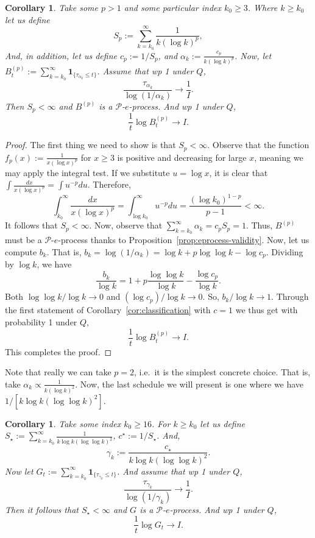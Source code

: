 \documentclass{article}
\newcommand{\PP}{\mathcal P}
\newcommand{\ind}[1]{\mathbf{1}_{\{#1\}}}
\newtheorem{corollary}[theorem]{Corollary}
\theoremstyle{definition}
\begin{document}
\begin{corollary}\label{cor:logp}
Take some $p>1$ and some particular index $k_0\ge 3$. Where $k\ge k_0$ let us define
\[
S_p:=\sum_{k=k_0}^\infty \frac{1}{k(\log k)^p},
\]
And, in addition, let us define $c_p:=1/S_p$, and $\alpha_k:=\frac{c_p}{k(\log k)^p}$. Now, let $B_t^{(p)}:=\sum_{k=k_0}^\infty \ind{\tau_{\alpha_k}\le t}$. Assume that wp 1 under $Q$,
\[
\frac{\tau_{\alpha_k}}{\log(1/\alpha_k)} \longrightarrow \frac{1}{I}.
\]
Then $S_p<\infty$ and $B^{(p)}$ is a $\mathcal P$-$e$-process. And wp 1 under $Q$,
\[
\frac{1}{t}\log B_t^{(p)}\longrightarrow I.
\]
\end{corollary}

\begin{proof}
The first thing we need to show is that $S_p<\infty$. Observe that the function $f_p(x):=\frac{1}{x(\log x)^p}$ for $x\ge 3$ is positive and decreasing for large $x$, meaning we may apply the integral test. If we substitute $u=\log x$, it is clear that $\int \frac{dx}{x(\log x)^p}=\int u^{-p}du$. Therefore,
\[
\int_{k_0}^{\infty} \frac{dx}{x(\log x)^p} = \int_{\log k_0}^{\infty} u^{-p}du = \frac{(\log k_0)^{1-p}}{p-1}<\infty.
\]
It follows that $S_p<\infty$. Now, observe that $\sum_{k=k_0}^{\infty}\alpha_k=c_p S_p=1$. Thus, $B^{(p)}$ must be a $\PP$-$e$-process thanks to Proposition~\ref{prop:eprocess-validity}. Now, let us compute $b_k$. That is, $b_k=\log(1/\alpha_k)=\log k + p\log\log k - \log c_p$. Dividing by $\log k$, we have
\[
\frac{b_k}{\log k} = 1 + p\frac{\log \log k}{\log k}-\frac{\log c_p}{\log k}.
\]
Both $\log\log k/\log k\to 0$ and $(\log c_p)/\log k\to 0$. So, $b_k/\log k\to 1$. Through the first statement of Corollary~\ref{cor:classification} with $c=1$ we thus get with probability 1 under $Q$,
\[
\frac{1}{t}\log B_t^{(p)}\longrightarrow I.
\]
This completes the proof.
\end{proof}

Note that really we can take $p=2$, i.e.\ it is the simplest concrete choice. That is, take $\alpha_k\propto \frac{1}{k(\log k)^2}$. Now, the last schedule we will present is one where we have $1/[k\log k(\log\log k)^2]$.

\begin{corollary}\label{cor:gamma}
Take some index $k_0\ge 16$. For $k\ge k_0$ let us define $S_\star:=\sum_{k=k_0}^\infty\frac{1}{k\log k(\log\log k)^2}$, $c^\star:=1/S_\star$. And,
\[
\gamma_k:=\frac{c_\star}{k\log k(\log\log k)^2}.
\]
Now let $G_t:=\sum_{k=k_0}^\infty \ind{\tau_{\gamma_k}\le t}$. And assume that wp 1 under $Q$,
\[
\frac{\tau_{\gamma_k}}{\log(1/\gamma_k)}\longrightarrow \frac{1}{I}.
\]
Then it follows that $S_\star<\infty$ and $G$ is a $\mathcal P$-$e$-process. And wp 1 under $Q$,
\[
\frac{1}{t}\log G_t\longrightarrow I.
\]
\end{corollary}
\end{document}
